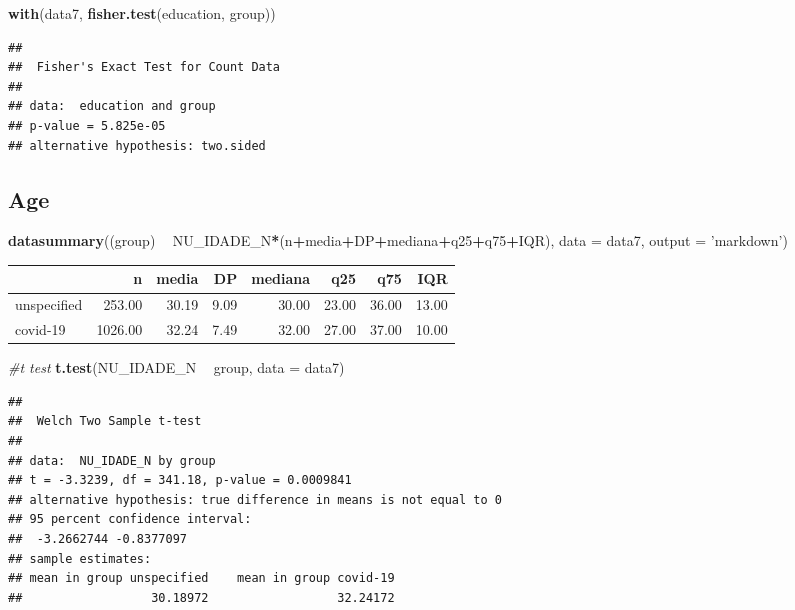 \documentclass[
]{article}
\newenvironment{Shaded}{\begin{snugshade}}{\end{snugshade}}
\newcommand{\CommentTok}[1]{\textcolor[rgb]{0.56,0.35,0.01}{\textit{#1}}}
\newcommand{\DataTypeTok}[1]{\textcolor[rgb]{0.13,0.29,0.53}{#1}}
\newcommand{\KeywordTok}[1]{\textcolor[rgb]{0.13,0.29,0.53}{\textbf{#1}}}
\newcommand{\NormalTok}[1]{#1}
\newcommand{\OperatorTok}[1]{\textcolor[rgb]{0.81,0.36,0.00}{\textbf{#1}}}
\newcommand{\StringTok}[1]{\textcolor[rgb]{0.31,0.60,0.02}{#1}}
\begin{document}
\begin{Shaded}
\begin{Highlighting}[]
\KeywordTok{with}\NormalTok{(data7, }\KeywordTok{fisher.test}\NormalTok{(education, group))}
\end{Highlighting}
\end{Shaded}

\begin{verbatim}
## 
##  Fisher's Exact Test for Count Data
## 
## data:  education and group
## p-value = 5.825e-05
## alternative hypothesis: two.sided
\end{verbatim}

\hypertarget{age}{%
\subsection{Age}\label{age}}

\begin{Shaded}
\begin{Highlighting}[]
\KeywordTok{datasummary}\NormalTok{((group) }\OperatorTok{~}\StringTok{  }\NormalTok{NU_IDADE_N}\OperatorTok{*}\NormalTok{(n}\OperatorTok{+}\NormalTok{media}\OperatorTok{+}\NormalTok{DP}\OperatorTok{+}\NormalTok{mediana}\OperatorTok{+}\NormalTok{q25}\OperatorTok{+}\NormalTok{q75}\OperatorTok{+}\NormalTok{IQR),}
            \DataTypeTok{data =}\NormalTok{ data7, }\DataTypeTok{output =} \StringTok{'markdown'}\NormalTok{)}
\end{Highlighting}
\end{Shaded}

\begin{longtable}[]{@{}lrrrrrrr@{}}
\toprule
& n & media & DP & mediana & q25 & q75 & IQR\tabularnewline
\midrule
\endhead
unspecified & 253.00 & 30.19 & 9.09 & 30.00 & 23.00 & 36.00 &
13.00\tabularnewline
covid-19 & 1026.00 & 32.24 & 7.49 & 32.00 & 27.00 & 37.00 &
10.00\tabularnewline
\bottomrule
\end{longtable}

\begin{Shaded}
\begin{Highlighting}[]
\CommentTok{#t test}
\KeywordTok{t.test}\NormalTok{(NU_IDADE_N }\OperatorTok{~}\StringTok{ }\NormalTok{group, }\DataTypeTok{data =}\NormalTok{ data7)}
\end{Highlighting}
\end{Shaded}

\begin{verbatim}
## 
##  Welch Two Sample t-test
## 
## data:  NU_IDADE_N by group
## t = -3.3239, df = 341.18, p-value = 0.0009841
## alternative hypothesis: true difference in means is not equal to 0
## 95 percent confidence interval:
##  -3.2662744 -0.8377097
## sample estimates:
## mean in group unspecified    mean in group covid-19 
##                  30.18972                  32.24172
\end{verbatim}
\end{document}
